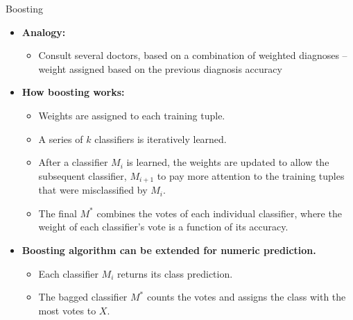 \begin{frame}{Boosting}
  \begin{itemize}
  \item \textbf{Analogy:}
    \begin{itemize}
    \item Consult several doctors, based on a combination of weighted diagnoses -- weight assigned based on the previous diagnosis accuracy
    \end{itemize}
  \item \textbf{How boosting works:}
    \begin{itemize}
    \item Weights are assigned to each training tuple.
    \item A series of $k$ classifiers is iteratively learned.
    \item After a classifier $M_i$ is learned, the weights are updated to allow the subsequent classifier, $M_{i+1}$ to pay more attention to the training tuples that were misclassified by $M_i$.
    \item The final $M^*$ combines the votes of each individual classifier, where the weight of each classifier's vote is a function of its accuracy.
    \end{itemize}
  \item \textbf{Boosting algorithm can be extended for numeric prediction.}
    \begin{itemize}
    \item Each classifier $M_i$ returns its class prediction.
    \item The bagged classifier $M^*$ counts the votes and assigns the class with the most votes to $X$.
    \end{itemize}
  \end{itemize}
\end{frame}

